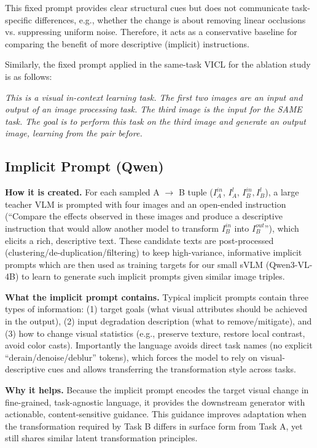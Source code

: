 \noindent This fixed prompt provides clear structural cues but does not communicate task-specific differences, e.g., whether the change is about removing linear occlusions vs. suppressing uniform noise. Therefore, it acts as a conservative baseline for comparing the benefit of more descriptive (implicit) instructions.

\noindent Similarly, the fixed prompt applied in the same-task VICL for the ablation study is as follows:

\begin{tcolorbox}[colback=gray!20, colframe=gray!20, boxrule=0pt, left=3pt, right=3pt, top=3pt, bottom=3pt]
\emph{This is a visual in-context learning task. The first two images are an input and output of an image processing task. The third image is the input for the SAME task. The goal is to perform this task on the third image and generate an output image, learning from the pair before.}
\end{tcolorbox}

\subsection{Implicit Prompt (Qwen)}
\textbf{How it is created.} For each sampled A $\rightarrow$ B tuple ($I_A^{in}$, $I_A^{l}$, $I_B^{in}, I_B^l$), a large teacher VLM is prompted with four images and an open-ended instruction (``Compare the effects observed in these images and produce a descriptive instruction that would allow another model to transform $I_B^{in}$ into $I_B^{out}$''), which elicits a rich, descriptive text. These candidate texts are post-processed (clustering\slash de-duplication\slash filtering) to keep high-variance, informative implicit prompts which are then used as training targets for our small sVLM (Qwen3-VL-4B) to learn to generate such implicit prompts given similar image triples.

\noindent \textbf{What the implicit prompt contains.} Typical implicit prompts contain three types of information: (1) target goals (what visual attributes should be achieved in the output), (2) input degradation description (what to remove/mitigate), and (3) how to change visual statistics (e.g., preserve texture, restore local contrast, avoid color casts). Importantly the language avoids direct task names (no explicit ``derain/denoise/deblur'' tokens), which forces the model to rely on visual-descriptive cues and allows transferring the transformation style across tasks.

\noindent \textbf{Why it helps.} Because the implicit prompt encodes the target visual change in fine-grained, task-agnostic language, it provides the downstream generator with actionable, content-sensitive guidance. This guidance improves adaptation when the transformation required by Task B differs in surface form from Task A, yet still shares similar latent transformation principles.


